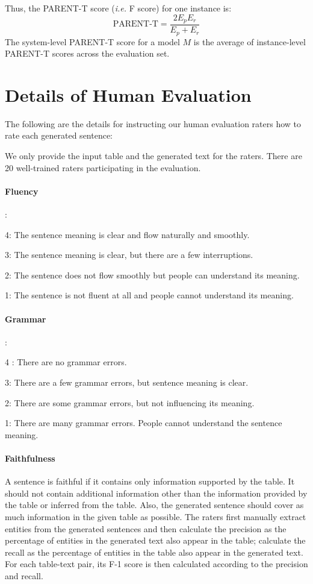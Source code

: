 \documentclass[11pt,a4paper]{article}
\begin{document}
Thus, the PARENT-T score (\textit{i.e.} F score) for one instance is:
\begin{equation}
    \text{PARENT-T} = \frac{2E_p E_r}{E_p + E_r}
\end{equation}
The system-level PARENT-T score for a model $M$ is the average of instance-level PARENT-T scores across the evaluation set.


\section{Details of Human Evaluation} \label{app:human_evaluation}

The following are the details for instructing our human evaluation raters how to rate each generated sentence:

We only provide the input table and the generated text for the raters. There are 20 well-trained raters participating in the evaluation.

\paragraph{Fluency}:

4: The sentence meaning is clear and flow naturally and smoothly.

3: The sentence meaning is clear, but there are a few interruptions.

2: The sentence does not flow smoothly but people can understand its meaning.

1: The sentence is not fluent at all and people cannot understand its meaning.


\paragraph{Grammar}:

4 : There are no grammar errors.

3:  There are a few grammar errors, but sentence meaning is clear.

2:  There are some grammar errors, but not influencing its meaning.

1:  There are many grammar errors. People cannot understand the sentence meaning.


\paragraph{Faithfulness}

A sentence is faithful if it contains only information supported by the table. It should not contain additional information other than the information provided by the table or inferred from the table. Also, the generated sentence should cover as much information in the given table as possible. The raters first manually extract entities from the generated sentences and then calculate the precision as the percentage of entities in the generated text also appear in the table; calculate the recall as the percentage of entities in the table also appear in the generated text. For each table-text pair, its F-1 score is then calculated according to the precision and recall.
\end{document}
